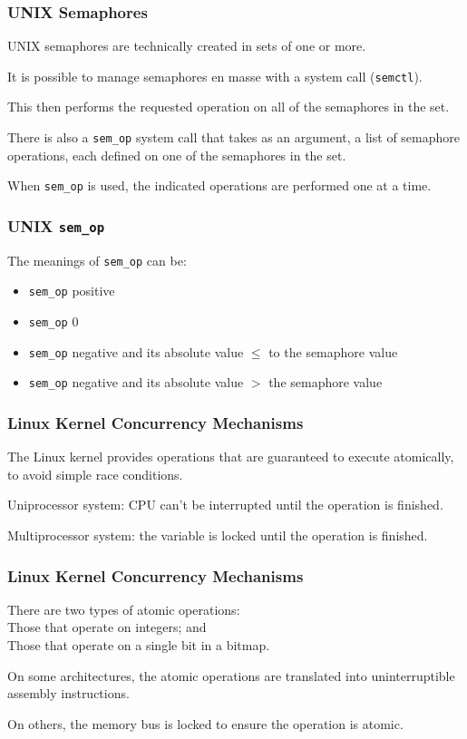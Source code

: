 \begin{frame}
\frametitle{UNIX Semaphores}

UNIX semaphores are technically created in sets of one or more. 

It is possible to manage semaphores en masse with a system call (\texttt{semctl}).

This then performs the requested operation on all of the semaphores in the set. 

There is also a \texttt{sem\_op} system call that takes as an argument, a list of semaphore operations, each defined on one of the semaphores in the set. 

When \texttt{sem\_op} is used, the indicated operations are performed one at a time.

\end{frame}

\begin{frame}
\frametitle{UNIX \texttt{sem\_op}}

The meanings of \texttt{sem\_op} can be:
\begin{itemize}
    \item \texttt{sem\_op} positive
    \item \texttt{sem\_op} 0
    \item \texttt{sem\_op} negative and its absolute value $\leq$ to the semaphore value
    \item \texttt{sem\_op} negative and its absolute value $>$ the semaphore value
\end{itemize}

\end{frame}

\begin{frame}
\frametitle{Linux Kernel Concurrency Mechanisms}

The Linux kernel provides operations that are guaranteed to execute atomically, to avoid simple race conditions.

Uniprocessor system: CPU can't be interrupted until the operation is finished.

Multiprocessor system: the variable is locked until the operation is finished.

\end{frame}

\begin{frame}
\frametitle{Linux Kernel Concurrency Mechanisms}

There are two types of atomic operations:\\
\quad Those that operate on integers; and\\
\quad Those that operate on a single bit in a bitmap. 

On some architectures, the atomic operations are translated into uninterruptible assembly instructions.

On others, the memory bus is locked to ensure the operation is atomic.

\end{frame}


